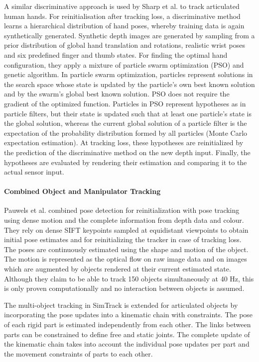 A similar discriminative approach is used by Sharp et al. \cite{Sharp2015} to track articulated human hands. For reinitialisation after tracking loss, a discriminative method learns a hierarchical distribution of hand poses, whereby training data is again synthetically generated. Synthetic depth images are generated by sampling from a prior distribution of global hand translation and rotations, realistic wrist poses and six predefined finger and thumb states.
For finding the optimal hand configuration, they apply a mixture of particle swarm optimization (PSO) and genetic algorithm. In particle swarm optimization, particles represent solutions in the search space whose state is updated by the particle's own best known solution and by the swarm's global best known solution. PSO does not require the gradient of the optimized function.
Particles in PSO represent hypotheses as in particle filters, but their state is updated such that at least one particle's state is the global solution, whereas the current global solution of a particle filter is the expectation of the probability distribution formed by all particles (Monte Carlo expectation estimation).
At tracking loss, these hypotheses are reinitialized by the prediction of the discriminative method on the new depth input. Finally, the hypotheses are evaluated by rendering their estimation and comparing it to the actual sensor input.

\paragraph{Combined Object and Manipulator Tracking}
Pauwels et al. \cite{Pauwels2015} combined pose detection for reinitialization with pose tracking using dense motion and the complete information from depth data and colour. They rely on dense SIFT keypoints sampled at equidistant viewpoints to obtain initial pose estimates and for reinitializing the tracker in case of tracking loss.
The poses are continuously estimated using the shape and motion of the object. The motion is represented as the optical flow on raw image data and on images which are augmented by objects rendered at their current estimated state.
Although they claim to be able to track 150 objects simultaneously at 40 Hz, this is only proven computationally and no interaction between objects is assumed.

The multi-object tracking in SimTrack is extended for articulated objects \cite{Pauwels2014} by incorporating the pose updates into a kinematic chain with constraints. The pose of each rigid part is estimated independently from each other. The links between parts can be constrained to define free and static joints. The complete update of the kinematic chain takes into account the individual pose updates per part and the movement constraints of parts to each other.


